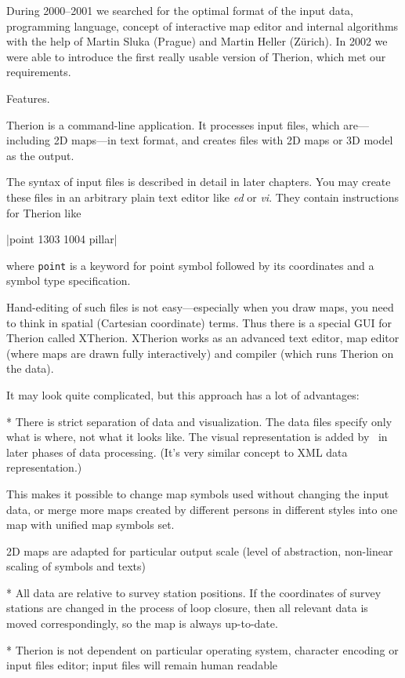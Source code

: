 During 2000--2001 we searched for the optimal format of the input data, programming 
language, concept of interactive map editor and internal algorithms with the 
help of Martin Sluka (Prague) and Martin Heller (Z\"urich). In 2002 we were able to 
introduce the first really usable version of Therion, which met our requirements.


\subchapter Features.

Therion is a command-line application. It processes input files, which 
are---including 2D maps---in text format, and creates files with 2D maps or 
3D model as the output.

The syntax of input files is described in detail in later chapters. 
You may create these files in an arbitrary plain text editor like 
{\it ed} or {\it vi}. They contain instructions for Therion like 

|point 1303 1004 pillar| 

where {\tt point} is a keyword for point symbol 
followed by its coordinates and a symbol type specification.

Hand-editing of such files is not easy---especially when you draw maps, you 
need to think in spatial (Cartesian coordinate) terms. Thus there is a special 
GUI for Therion called XTherion. XTherion works as an advanced text editor, map 
editor (where maps are drawn fully interactively) and compiler (which runs
Therion on the data).

It may look quite complicated, but this approach has a lot of advantages:

\list
* There is strict separation of data and visualization. The data files specify 
  only what is where, not what it looks like. The visual representation 
  is added by \MP\ in later phases of data processing. (It's very 
  similar concept to XML data representation.) 
  
  This makes it possible to change map symbols used without changing the 
  input data, or merge more maps created by different persons in different 
  styles into one map with unified map symbols set.

  2D maps are adapted for particular output scale (level of abstraction,
  non-linear scaling of symbols and texts)
  
* All data are relative to survey station positions. If the coordinates
  of survey stations are changed in the process of loop closure, then all relevant
  data is moved correspondingly, so the map is always up-to-date.

* Therion is not dependent on particular operating system, character encoding
  or input files editor; input files will remain human readable

